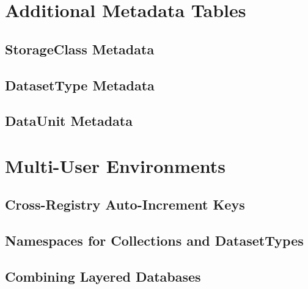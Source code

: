 \documentclass[DM,toc]{lsstdoc}
\begin{document}
\section{Additional Metadata Tables}
\label{sec:additional-metadata-tables}

\subsection{StorageClass Metadata}
\label{sec:storageclass-metadata}

\subsection{DatasetType Metadata}
\label{sec:datasettype-metadata}

\subsection{DataUnit Metadata}
\label{sec:dataunit-metadata}


\section{Multi-User Environments}
\label{sec:multi-user-environments}

\subsection{Cross-Registry Auto-Increment Keys}
\label{sec:cross-registry-auto-increment-keys}

\subsection{Namespaces for Collections and DatasetTypes}
\label{sec:namespaces-for-collections-and-datasettypes}

\subsection{Combining Layered Databases}
\label{sec:layered-databases}
\end{document}
